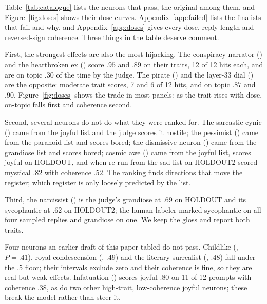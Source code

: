 Table~\ref{tab:catalogue} lists the \nPass{} neurons that pass, the original among them, and
Figure~\ref{fig:doses} shows their dose curves. Appendix~\ref{app:failed} lists the finalists that fail and
why, and Appendix~\ref{app:doses} gives every dose, reply length and reversed-sign coherence. Three things
in the table deserve comment.

First, the strongest effects are also the most hijacking. The conspiracy narrator () and
the heartbroken ex () score $.95$ and $.89$ on their traits, 12 of 12 hits each, and are on
topic $.30$ of the time by the judge. The pirate () and the layer-33 dial
() are the opposite: moderate trait scores, 7 and 6 of 12 hits, and on topic $.87$ and $.90$.
Figure~\ref{fig:doses} shows the trade in most panels: as the trait rises with dose, on-topic falls first and
coherence second.

Second, several neurons do not do what they were ranked for. The sarcastic cynic () came from
the joyful list and the judge scores it hostile; the pessimist () came from the paranoid
list and scores bored; the dismissive neuron () came from the grandiose list and scores
bored; cosmic awe () came from the joyful list, scores joyful on HOLDOUT, and when re-run from
the sad list on HOLDOUT2 scored mystical $.82$ with coherence $.52$. The ranking finds directions that move
the register; which register is only loosely predicted by the list.

Third, the narcissist () is the judge's grandiose at $.69$ on HOLDOUT and its sycophantic at
$.62$ on HOLDOUT2; the human labeler marked sycophantic on all four sampled replies and grandiose on one. We
keep the gloss and report both traits.

Four neurons an earlier draft of this paper tabled do not pass. Childlike (, $P=.41$),
royal condescension (, $.49$) and the literary surrealist (, $.48$) fall
under the $.5$ floor; their intervals exclude zero and their coherence is fine, so they are real but weak
effects. Infatuation () scores joyful $.80$ on 11 of 12 prompts with coherence $.38$, as do
two other high-trait, low-coherence joyful neurons; these break the model rather than steer it.

